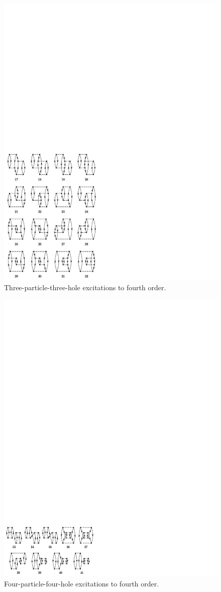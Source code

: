 \documentclass[%
twoside,                 %
final,                   %
10pt]{article}
\newenvironment{doconceexercise}{}{}
\begin{document}
\begin{doconceexercise}
\begin{figure}[t]
  \centerline{\includegraphics[width=0.6\linewidth]{fig-proj/3p3h.pdf}}
  \caption{
  Three-particle-three-hole excitations to fourth order. \label{fig:fourthorder3p3h}
  }
\end{figure}



\begin{figure}[t]
  \centerline{\includegraphics[width=0.6\linewidth]{fig-proj/4p4h.pdf}}
  \caption{
  Four-particle-four-hole excitations to fourth order. \label{fig:fourthorder4p4h}
  }
\end{figure}



\end{doconceexercise}
\end{document}
